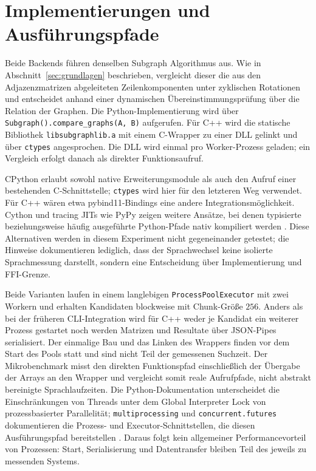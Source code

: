 \documentclass[a4paper,12pt, twoside]{report}
\theoremstyle{definition}
\begin{document}
\section{Implementierungen und Ausführungspfade}
\label{sec:backend_implementierungen}

Beide Backends führen denselben Subgraph Algorithmus aus. Wie in Abschnitt~\ref{sec:grundlagen} beschrieben, vergleicht dieser die aus den Adjazenzmatrizen abgeleiteten Zeilenkomponenten unter zyklischen Rotationen und entscheidet anhand einer dynamischen Übereinstimmungsprüfung über die Relation der Graphen. Die Python-Implementierung wird über \texttt{Subgraph().compare\_graphs(A, B)} aufgerufen. Für C++ wird die statische Bibliothek \texttt{libsubgraphlib.a} mit einem C-Wrapper zu einer DLL gelinkt und über \texttt{ctypes} angesprochen. Die DLL wird einmal pro Worker-Prozess geladen; ein Vergleich erfolgt danach als direkter Funktionsaufruf.

CPython erlaubt sowohl native Erweiterungsmodule als auch den Aufruf einer bestehenden C-Schnittstelle; \texttt{ctypes} wird hier für den letzteren Weg verwendet. Für C++ wären etwa pybind11-Bindings eine andere Integrationsmöglichkeit. Cython und tracing JITs wie PyPy zeigen weitere Ansätze, bei denen typisierte beziehungsweise häufig ausgeführte Python-Pfade nativ kompiliert werden \cite{python314extending,python314ctypes,pybind11docs,behnel2011cython,bolz2009pypy}. Diese Alternativen werden in diesem Experiment nicht gegeneinander getestet; die Hinweise dokumentieren lediglich, dass der Sprachwechsel keine isolierte Sprachmessung darstellt, sondern eine Entscheidung über Implementierung und FFI-Grenze.

Beide Varianten laufen in einem langlebigen \texttt{ProcessPoolExecutor} mit zwei Workern und erhalten Kandidaten blockweise mit Chunk-Größe $256$. Anders als bei der früheren CLI-Integration wird für C++ weder je Kandidat ein weiterer Prozess gestartet noch werden Matrizen und Resultate über JSON-Pipes serialisiert. Der einmalige Bau und das Linken des Wrappers finden vor dem Start des Pools statt und sind nicht Teil der gemessenen Suchzeit. Der Mikrobenchmark misst den direkten Funktionspfad einschließlich der Übergabe der Arrays an den Wrapper und vergleicht somit reale Aufrufpfade, nicht abstrakt bereinigte Sprachlaufzeiten. Die Python-Dokumentation unterscheidet die Einschränkungen von Threads unter dem Global Interpreter Lock von prozessbasierter Parallelität; \texttt{multiprocessing} und \texttt{concurrent.futures} dokumentieren die Prozess- und Executor-Schnittstellen, die diesen Ausführungspfad bereitstellen \cite{python314gil,python314multiprocessing,python314futures}. Daraus folgt kein allgemeiner Performancevorteil von Prozessen: Start, Serialisierung und Datentransfer bleiben Teil des jeweils zu messenden Systems.
\end{document}

